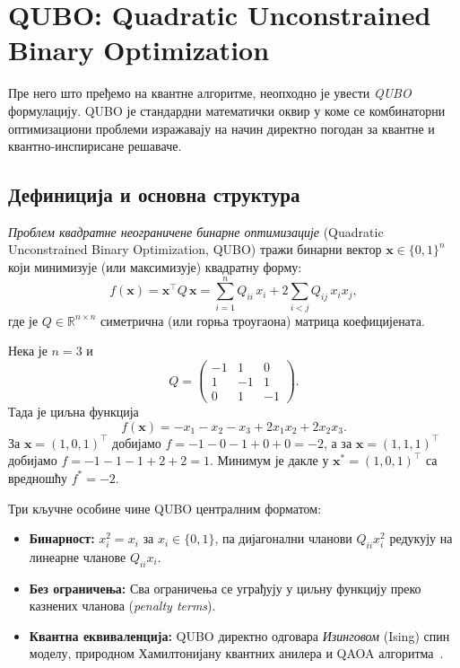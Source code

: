 \section{QUBO: Quadratic Unconstrained Binary Optimization}
\label{sec:qubo}

Пре него што пређемо на квантне алгоритме, неопходно је увести
\emph{QUBO} формулацију. QUBO је стандардни математички оквир у коме
се комбинаторни оптимизациони проблеми изражавају на начин
директно погодан за квантне и квантно-инспирисане решаваче.

\subsection{Дефиниција и основна структура}

\begin{definition}
\emph{Проблем квадратне неограничене бинарне оптимизације}
(Quadratic Unconstrained Binary Optimization, QUBO) тражи
бинарни вектор $\mathbf{x} \in \{0,1\}^n$ који минимизује
(или максимизује) квадратну форму:
\[
  f(\mathbf{x})
  = \mathbf{x}^\top Q\, \mathbf{x}
  = \sum_{i=1}^{n} Q_{ii}\, x_i
    + 2\sum_{i < j} Q_{ij}\, x_i x_j,
\]
где је $Q \in \mathbb{R}^{n \times n}$ симетрична (или горња
троугаона) матрица коефицијената.
\end{definition}

\begin{example}[QUBO матрица за $n = 3$]
Нека је $n = 3$ и
\[
  Q =
  \begin{pmatrix}
    -1 &  1 &  0 \\
     1 & -1 &  1 \\
     0 &  1 & -1
  \end{pmatrix}.
\]
Тада је циљна функција
\[
  f(\mathbf{x}) = -x_1 - x_2 - x_3 + 2x_1 x_2 + 2x_2 x_3.
\]
За $\mathbf{x} = (1, 0, 1)^\top$ добијамо $f = -1 - 0 - 1 + 0 + 0 = -2$,
а за $\mathbf{x} = (1, 1, 1)^\top$ добијамо $f = -1 - 1 - 1 + 2 + 2 = 1$.
Минимум је дакле у $\mathbf{x}^* = (1, 0, 1)^\top$ са вредношћу $f^* = -2$.
\end{example}

Три кључне особине чине QUBO централним форматом:
\begin{itemize}[nosep]
  \item \textbf{Бинарност:} $x_i^2 = x_i$ за $x_i \in \{0,1\}$,
        па дијагонални чланови $Q_{ii} x_i^2$ редукују на
        линеарне чланове $Q_{ii} x_i$.
  \item \textbf{Без ограничења:} Сва ограничења се уграђују у
        циљну функцију преко казнених чланова (\emph{penalty terms}).
  \item \textbf{Квантна еквиваленција:} QUBO директно одговара
        \emph{Изинговом} (Ising) спин моделу, природном Хамилтонијану
        квантних анилера и QAOA алгоритма~\cite{mcgeoch2014}.
\end{itemize}

